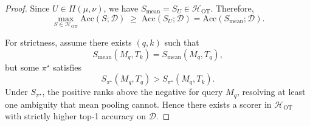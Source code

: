 \begin{proof}
Since $U\in\Pi(\mu,\nu)$,
we have
$S_{\mathrm{mean}} = S_U \in \mathcal{H}_{\mathrm{OT}}$.
Therefore,
\[
\max_{S\in\mathcal{H}_{\mathrm{OT}}}
\mathrm{Acc}(S;\mathcal{D})
\;\ge\;
\mathrm{Acc}(S_U;\mathcal{D})
=
\mathrm{Acc}(S_{\mathrm{mean}};\mathcal{D}).
\]

For strictness,
assume there exists $(q,k)$ such that
\[
S_{\mathrm{mean}}(M_q,T_k)
=
S_{\mathrm{mean}}(M_q,T_q),
\]
but some
$\pi^\star$
satisfies
\[
S_{\pi^\star}(M_q,T_q)
>
S_{\pi^\star}(M_q,T_k).
\]
Under $S_{\pi^\star}$,
the positive ranks above the negative for query $M_q$,
resolving at least one ambiguity
that mean pooling cannot.
Hence there exists a scorer in
$\mathcal{H}_{\mathrm{OT}}$
with strictly higher top-1 accuracy on
$\mathcal{D}$.
\end{proof}
